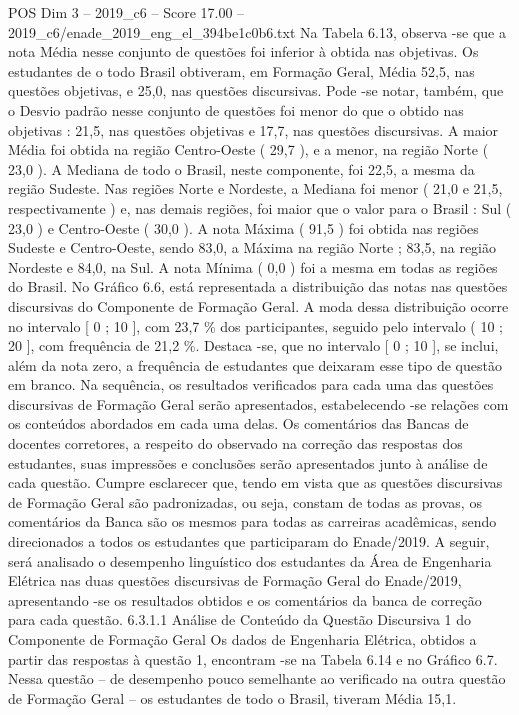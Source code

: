 \begin{textsample}{POS Dim 3 – 2019\_c6 – Score 17.00 – 2019\_c6/enade\_2019\_eng\_el\_394be1c0b6.txt}
Na Tabela 6.13, observa -se que a nota Média nesse conjunto de questões foi inferior à obtida nas objetivas.
Os estudantes de o todo Brasil obtiveram, em Formação Geral, Média 52,5, nas questões objetivas, e 25,0, nas questões discursivas.
Pode -se notar, também, que o Desvio padrão nesse conjunto de questões foi menor do que o obtido nas objetivas : 21,5, nas questões objetivas e 17,7, nas questões discursivas.
A maior Média foi obtida na região Centro-Oeste ( 29,7 ), e a menor, na região Norte ( 23,0 ).
A Mediana de todo o Brasil, neste componente, foi 22,5, a mesma da região Sudeste.
Nas regiões Norte e Nordeste, a Mediana foi menor ( 21,0 e 21,5, respectivamente ) e, nas demais regiões, foi maior que o valor para o Brasil : Sul ( 23,0 ) e Centro-Oeste ( 30,0 ).
A nota Máxima ( 91,5 ) foi obtida nas regiões Sudeste e Centro-Oeste, sendo 83,0, a Máxima na região Norte ; 83,5, na região Nordeste e 84,0, na Sul.
A nota Mínima ( 0,0 ) foi a mesma em todas as regiões do Brasil.
No Gráfico 6.6, está representada a distribuição das notas nas questões discursivas do Componente de Formação Geral.
A moda dessa distribuição ocorre no intervalo [ 0 ; 10 ], com 23,7 \% dos participantes, seguido pelo intervalo ( 10 ; 20 ], com frequência de 21,2 \%.
Destaca -se, que no intervalo [ 0 ; 10 ], se inclui, além da nota zero, a frequência de estudantes que deixaram esse tipo de questão em branco.
Na sequência, os resultados verificados para cada uma das questões discursivas de Formação Geral serão apresentados, estabelecendo -se relações com os conteúdos abordados em cada uma delas.
Os comentários das Bancas de docentes corretores, a respeito do observado na correção das respostas dos estudantes, suas impressões e conclusões serão apresentados junto à análise de cada questão.
Cumpre esclarecer que, tendo em vista que as questões discursivas de Formação Geral são padronizadas, ou seja, constam de todas as provas, os comentários da Banca são os mesmos para todas as carreiras acadêmicas, sendo direcionados a todos os estudantes que participaram do Enade/2019.
A seguir, será analisado o desempenho linguístico dos estudantes da Área de Engenharia Elétrica nas duas questões discursivas de Formação Geral do Enade/2019, apresentando -se os resultados obtidos e os comentários da banca de correção para cada questão. 6.3.1.1 Análise de Conteúdo da Questão Discursiva 1 do Componente de Formação Geral Os dados de Engenharia Elétrica, obtidos a partir das respostas à questão 1, encontram -se na Tabela 6.14 e no Gráfico 6.7.
Nessa questão – de desempenho pouco semelhante ao verificado na outra questão de Formação Geral – os estudantes de todo o Brasil, tiveram Média 15,1.

\end{textsample}
